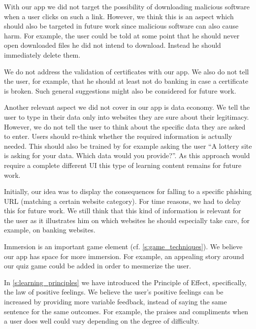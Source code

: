 \begin{description}[leftmargin=0cm]
	\item[Malicious Downloads] With our app we did not target the possibility of downloading malicious software when a user clicks on such a link.
	However, we think this is an aspect which should also be targeted in future work since malicious software can also cause harm.
	For example, the user could be told at some point that he should never open downloaded files he did not intend to download.
	Instead he should immediately delete them.
	\item[Certificate Validation] We do not address the validation of certificates with our app. We also do not tell the user, for example, that he should at least not do banking in case a certificate is broken.
	Such general suggestions might also be considered for future work.
	\item[Data Economy] Another relevant aspect we did not cover in our app is data economy.
	We tell the user to type in their data only into websites they are sure about their legitimacy.
	However, we do not tell the user to think about the specific data they are asked to enter.
	Users should re-think whether the required information is actually needed.
	This should also be trained by for example asking the user ``A lottery site is asking for your data. Which data would you provide?''. As this approach would require a complete different UI this type of learning content remains for future work.
	\item[Consequences] Initially, our idea was to display the consequences for falling to a specific phishing URL (matching a certain website category). For time reasons, we had to delay this for future work.
	We still think that this kind of information is relevant for the user as it illustrates him on which websites he should especially take care, for example, on banking websites.
	\item[Increase Immersion] Immersion is an important game element (cf. \autoref{s:game_techniques}).
	We believe our app has space for more immersion. 
	For example, an appealing story around our quiz game could be added in order to mesmerize the user.
	\item[Increase Effect] In \autoref{s:learning_principles} we have introduced the Principle of Effect, specifically, the law of positive feelings. 
	We believe the user's positive feelings can be increased by providing more variable feedback, instead of saying the same sentence for the same outcomes.
	For example, the praises and compliments when a user does well could vary depending on the degree of difficulty.

\end{description}
